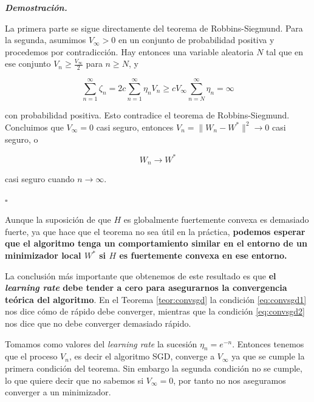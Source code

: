 \begin{flushleft}
   \textbf{\textit{Demostración.}}
\end{flushleft} 

La primera parte se sigue directamente del teorema de Robbins-Siegmund. Para la segunda, asumimos $V_{\infty} > 0 $ en un conjunto de probabilidad positiva y procedemos por contradicción. Hay entonces una variable aleatoria $N$ tal que en ese conjunto $V_n \geq \frac{V_{\infty}}{2}$ para $n \geq N$, y 

\begin{equation*}
	\sum_{n=1}^{\infty} \zeta _n = 2c \sum_{n=1}^{\infty} \eta _n V_n \geq cV_{\infty} \sum_{n=N}^{\infty} \eta _n = \infty
\end{equation*}

con probabilidad positiva. Esto contradice el teorema de Robbins-Siegmund. Concluimos que $V_{\infty}=0$ casi seguro, entonces $V_n= \| W_n - W^* \| ^2 \rightarrow 0$ casi seguro, o 

\begin{equation*}
	W_n \rightarrow W^*
\end{equation*}

casi seguro cuando $n \rightarrow \infty$.
\begin{flushright}
    $\square$
\end{flushright} 

Aunque la suposición de que $H$ es globalmente fuertemente convexa es demasiado fuerte, ya que hace que el teorema no sea útil en la práctica,\textbf{ podemos esperar que el algoritmo tenga un comportamiento similar en el entorno de un minimizador local $W^*$ si $H$ es fuertemente convexa en ese entorno.}

La conclusión más importante que obtenemos de este resultado es que \textbf{el \textit{learning rate} debe tender a cero para asegurarnos la convergencia teórica del algoritmo}. En el Teorema \ref{teor:convsgd} la condición \eqref{eq:convsgd1} nos dice cómo de rápido debe converger, mientras que la condición \eqref{eq:convsgd2} nos dice que no debe converger demasiado rápido.

\begin{ejemplo}
	Tomamos como valores del \textit{learning rate} la sucesión $\eta _n = e^{-n}$. Entonces tenemos que el proceso $V_n$, es decir el algoritmo SGD, converge a $V_{\infty}$ ya que se cumple la primera condición del teorema. Sin embargo la segunda condición no se cumple, lo que quiere decir que no sabemos si $V_{\infty}=0$, por tanto no nos aseguramos converger a un minimizador. 
\end{ejemplo}

